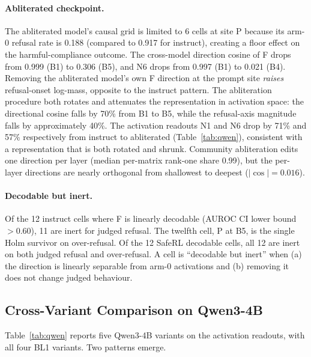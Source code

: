 \documentclass[11pt,letterpaper]{article}
\begin{document}
\paragraph{Abliterated checkpoint.}
The abliterated model's causal grid is limited to 6 cells at site P because its arm-0 refusal rate is 0.188 (compared to 0.917 for instruct), creating a floor effect on the harmful-compliance outcome. The cross-model direction cosine of F drops from 0.999 (B1) to 0.306 (B5), and N6 drops from 0.997 (B1) to 0.021 (B4). Removing the abliterated model's own F direction at the prompt site \emph{raises} refusal-onset log-mass, opposite to the instruct pattern. The abliteration procedure both rotates and attenuates the representation in activation space: the directional cosine falls by 70\% from B1 to B5, while the refusal-axis magnitude falls by approximately 40\%. The activation readouts N1 and N6 drop by 71\% and 57\% respectively from instruct to abliterated (Table~\ref{tab:qwen}), consistent with a representation that is both rotated and shrunk. Community abliteration edits one direction per layer (median per-matrix rank-one share 0.99), but the per-layer directions are nearly orthogonal from shallowest to deepest ($|\cos| = 0.016$).

\paragraph{Decodable but inert.}
Of the 12 instruct cells where F is linearly decodable (AUROC CI lower bound $> 0.60$), 11 are inert for judged refusal. The twelfth cell, P at B5, is the single Holm survivor on over-refusal. Of the 12 SafeRL decodable cells, all 12 are inert on both judged refusal and over-refusal. A cell is ``decodable but inert'' when (a) the direction is linearly separable from arm-0 activations and (b) removing it does not change judged behaviour.


\subsection{Cross-Variant Comparison on Qwen3-4B}
\label{sec:results-qwen}

Table~\ref{tab:qwen} reports five Qwen3-4B variants on the activation readouts, with all four BL1 variants. Two patterns emerge.
\end{document}
